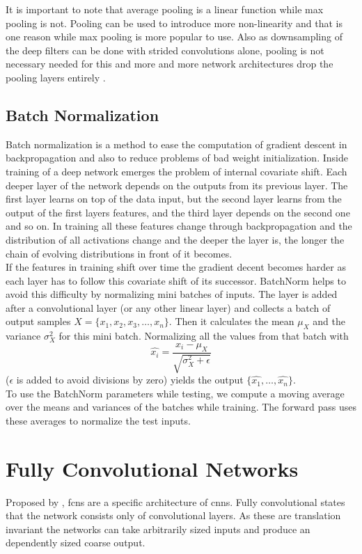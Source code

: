 It is important to note that average pooling is a linear function while max pooling is not. Pooling can be used to introduce more non-linearity and that is one reason while max pooling is more popular to use. Also as downsampling of the deep filters can be done with strided convolutions alone, pooling is not necessary needed for this and more and more network architectures drop the pooling layers entirely \citep{springenberg_striving_2014}.

\subsection{Batch Normalization} %
\label{sub:conepts:nn:batchnorm}
Batch normalization \citep{ioffe_batch_2015} is a method to ease the computation of gradient descent in backpropagation and also to reduce problems of bad weight initialization. Inside training of a deep network emerges the problem of internal covariate shift. Each deeper layer of the network depends on the outputs from its previous layer. The first layer learns on top of the data input, but the second layer learns from the output of the first layers features, and the third layer depends on the second one and so on. In training all these features change through backpropagation and the distribution of all activations change and the deeper the layer is, the longer the chain of evolving distributions in front of it becomes.\\
If the features in training shift over time the gradient decent becomes harder as each layer has to follow this covariate shift of its successor. BatchNorm helps to avoid this difficulty by normalizing mini batches of inputs. The layer is added after a convolutional layer (or any other linear layer) and collects a batch of output samples $X = \{x_1, x_2, x_3, \dots, x_n\}$. Then it calculates the mean $\mu_X$ and the variance $\sigma_X^2$ for this mini batch. Normalizing all the values from that batch with
\begin{equation}
    \hat{x_i} = \frac{x_i - \mu_X}{\sqrt{\sigma_X^2 + \epsilon}}
\end{equation}
($\epsilon$ is added to avoid divisions by zero) yields the output $\{\hat{x_1},\dots,\hat{x_n}\}$.\\
To use the BatchNorm parameters while testing, we compute a moving average over the means and variances of the batches while training. The forward pass uses these averages to normalize the test inputs.

\section{Fully Convolutional Networks}
\label{sec:concepts:fcn}
Proposed by \citet{long_fully_2015}, \glspl{fcn} are a specific architecture of \glspl{cnn}. Fully convolutional states that the network consists only of convolutional layers. As these are translation invariant the networks can take arbitrarily sized inputs and produce an dependently sized coarse output.

